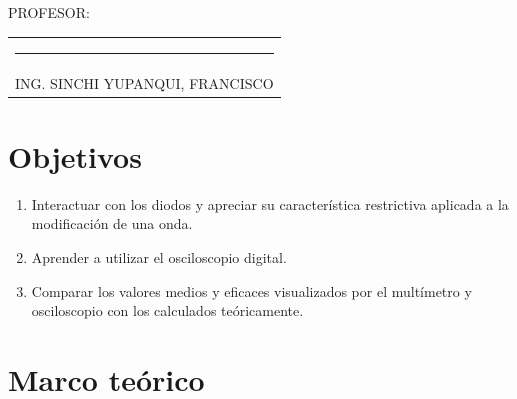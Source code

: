 \documentclass[a4paper,12pt]{report}
\begin{document}
{\large PROFESOR:} \\[2cm]
\begin{center}
\begin{tabular}{c}
\rule[3pt]{4.8in}{1pt}\\[1pt]
ING. SINCHI YUPANQUI, FRANCISCO 
\end{tabular}
\end{center}
\vfill
\newpage
\tableofcontents
\newpage
{} %
\setcounter{page}{1}  %
\chapter{Objetivos}
\begin{enumerate}
\item Interactuar con los diodos y apreciar su característica restrictiva aplicada a la modificación de una onda.
\item Aprender a utilizar el osciloscopio digital.
\item Comparar los valores medios y eficaces visualizados por el multímetro y osciloscopio con los calculados teóricamente.
\end{enumerate}
\chapter{Marco teórico}
\end{document}

